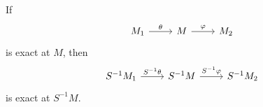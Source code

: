If
\[\begin{tikzcd}
	M_1\ar[r, "\theta"] & M\ar[r, "\varphi"] & M_2
\end{tikzcd}\]
is exact at $M$, then
\[\begin{tikzcd}
	S^{-1}M_1\ar[r, "S^{-1}\theta"]& S^{-1}M\ar[r, "S^{-1}\varphi"] & S^{-1}M_2
\end{tikzcd}\]
is exact at $S^{-1}M$.
